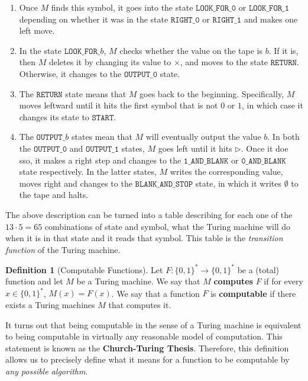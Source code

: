 \documentclass[a4paper, 12pt]{report}
\theoremstyle{remark}
\theoremstyle{definition}
\newtheorem{definition}{Definition}[section]
\begin{document}
\begin{example}
\begin{enumerate}
    \item Once $M$ finds this symbol, it goes into the state $\texttt{LOOK\_FOR\_0}$ or $\texttt{LOOK\_FOR\_1}$ depending on whether it was in the state $\texttt{RIGHT\_0}$ or $\texttt{RIGHT\_1}$ and makes one left move. 
    \item In the state $\texttt{LOOK\_FOR\_}b$, $M$ checks whether the value on the tape is $b$. If it is, then $M$ deletes it by changing its value to $\times$, and moves to the state $\texttt{RETURN}$. Otherwise, it changes to the $\texttt{OUTPUT\_0}$ state. 
    \item The $\texttt{RETURN}$ state means that $M$ goes back to the beginning. Specifically, $M$ moves leftward until it hits the first symbol that is not $0$ or $1$, in which case it changes its state to $\texttt{START}$. 
    \item The $\texttt{OUTPUT\_}b$ states mean that $M$ will eventually output the value $b$. In both the $\texttt{OUTPUT\_0}$ and $\texttt{OUTPUT\_1}$ states, $M$ goes left until it hits $\triangleright$. Once it doe sso, it makes a right step and changes to the $\texttt{1\_AND\_BLANK}$ or $\texttt{0\_AND\_BLANK}$ state respectively. In the latter states, $M$ writes the corresponding value, moves right and changes to the $\texttt{BLANK\_AND\_STOP}$ state, in which it writes $\emptyset$ to the tape and halts. 
\end{enumerate}
The above description can be turned into a table describing for each one of the $13 \cdot 5 = 65$ combinations of state and symbol, what the Turing machine will do when it is in that state and it reads that symbol. This table is the \textit{transition function} of the Turing machine. 
\end{example}

\begin{definition}[Computable Functions]
Let $F: \{0,1\}^* \longrightarrow \{0,1\}^*$ be a (total) function and let $M$ be a Turing machine. We say that $M$ \textbf{computes} $F$ if for every $x \in \{0,1\}^*$, $M(x) = F(x)$. We say that a function $F$ is \textbf{computable} if there exists a Turing machines $M$ that computes it. 
\end{definition}

It turns out that being computable in the sense of a Turing machine is equivalent to being computable in virtually any reasonable model of computation. This statement is known as the \textbf{Church-Turing Thesis}. Therefore, this definition allows us to precisely define what it means for a function to be computable by \textit{any possible algorithm}. 
\end{document}
